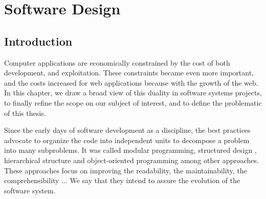 \chapter{Software Design} \label{chapter3}
\minitoc
\eject

\section{Introduction}

Computer applications are economically constrained by the cost of both development, and exploitation.
These constraints became even more important, and the costs increased for web applications because with the growth of the web.
In this chapter, we draw a broad view of this duality in software systems projects, to finally refine the scope on our subject of interest, and to define the problematic of this thesis.


Since the early days of software development as a discipline, the best practices advocate to organize the code into independent units to decompose a problem into many subproblems.
It was called modular programming, structured design \cite{Stevens1974}, hierarchical structure \cite{Dijkstra1968} and object-oriented programming among other approaches.
These approaches focus on improving the readability, the maintainability, the comprehensibility ...
We say that they intend to assure the evolution of the software system.


